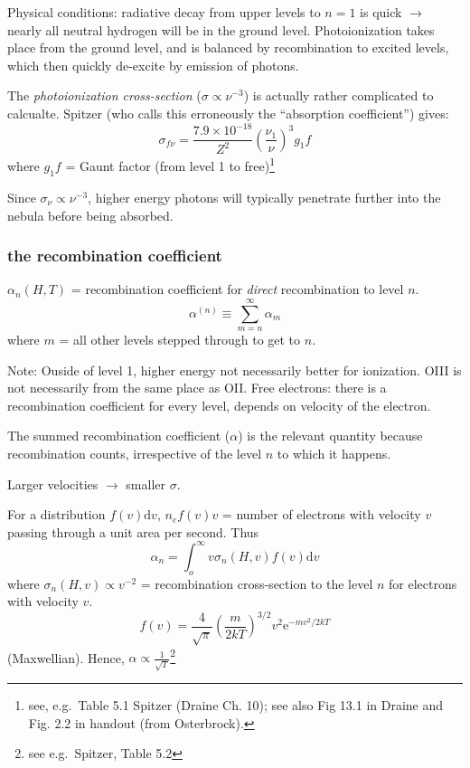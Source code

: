 \documentclass[12pt]{article}
\newcommand{\mar}[1]{\hspace{0pt}\marginpar{-\textcolor{black}{#1}-}}
\newcommand{\mynotes}[1]{\textcolor{mygreen}{#1}}
\begin{document}
\mar{54}Physical conditions: radiative decay from upper levels to $n=1$ is
quick $\rightarrow$ nearly all neutral hydrogen will be in the ground
level. Photoionization takes place from the ground level, and is balanced
by recombination to excited levels, which then quickly de-excite by
emission of photons.

The \emph{photoionization cross-section} ($\sigma \propto \nu^{-3}$) is actually
rather complicated to calcualte. Spitzer (who calls this erroneously the
``absorption coefficient'') gives:$${
    \sigma_{f\nu} = \frac{7.9\times10^{-18}}{Z^{2}}
    \left(\frac{\nu_{1}}{\nu}\right)^{3}g_{1}f
}$$
where $g_{1}f$ = Gaunt factor (from level 1 to free)\footnote{see, e.g.\
Table 5.1 Spitzer (Draine Ch. 10); see also Fig 13.1 in Draine and Fig. 2.2
in handout (from Osterbrock).}

Since $\sigma_{\nu} \propto \nu^{-3}$, higher energy photons will
typically penetrate further into the nebula before being absorbed.

\subsubsection{the recombination coefficient}\label{alpha}
$\alpha_{n}(H,T)$ = recombination coefficient for \emph{direct} recombination
to level $n$.$${
    \alpha^{(n)} \equiv \sum_{m=n}^{\infty}{\alpha_{m}}
}$$where $m$ = all other levels stepped through to get to $n$.

\mynotes{Note: Ouside of level 1, higher energy not necessarily better
for ionization. OIII is not necessarily from the same place as OII.
Free electrons: there is a recombination coefficient for every level,
depends on velocity of the electron.}

\mar{55}The summed recombination coefficient ($\alpha$) is the relevant
quantity because recombination counts, irrespective of the level $n$ to
which it happens.

\mynotes{Larger velocities $\rightarrow$ smaller $\sigma$.}

For a distribution $f(v)\mathrm{d}v$, $n_{e}f(v)v$ = number of electrons
with velocity $v$ passing through a unit area per second. Thus$${
    \alpha_{n} = \int_{o}^{\infty}{v\sigma_{n}(H,v)f(v)\mathrm{d}v}
}$$where $\sigma_{n}(H,v) \propto v^{-2}$ = recombination cross-section to the level
$n$ for electrons with velocity $v$.$${
    f(v) = \frac{4}{\sqrt{\pi}}\left(\frac{m}{2kT}
    \right)^{3/2}v^{2}\mathrm{e}^{-mv^{2}/2kT}
}$$(Maxwellian). Hence, $\alpha \propto \frac{1}{\sqrt{T}}$\footnote{see e.g.\
Spitzer, Table 5.2}
\end{document}
